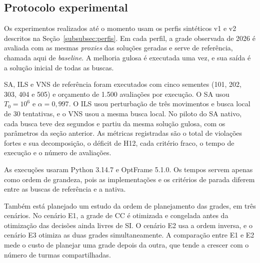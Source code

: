 \subsection{Protocolo experimental}
\label{subsec:protocolo}

Os experimentos realizados até o momento usam os perfis sintéticos v1 e v2 descritos na Seção~\ref{subsubsec:perfis}. Em cada perfil, a grade observada de 2026 é avaliada com as mesmas \textit{proxies} das soluções geradas e serve de referência, chamada aqui de \textit{baseline}. A melhoria gulosa é executada uma vez, e sua saída é a solução inicial de todas as buscas.

SA, ILS e VNS de referência foram executados com cinco sementes (101, 202, 303, 404 e 505) e orçamento de 1.500 avaliações por execução. O SA usou $T_0=10^6$ e $\alpha=0{,}997$. O ILS usou perturbação de três movimentos e busca local de 30 tentativas, e o VNS usou a mesma busca local. No piloto do SA nativo, cada busca teve dez segundos e partiu da mesma solução gulosa, com os parâmetros da seção anterior. As métricas registradas são o total de violações fortes e sua decomposição, o déficit de H12, cada critério fraco, o tempo de execução e o número de avaliações.

As execuções usaram Python 3.14.7 e OptFrame 5.1.0.  Os tempos servem apenas como ordem de grandeza, pois as implementações e os critérios de parada diferem entre as buscas de referência e a nativa.


Também está planejado um estudo da ordem de planejamento das grades, em três cenários. No cenário E1, a grade de CC é otimizada e congelada antes da otimização das decisões ainda livres de SI. O cenário E2 usa a ordem inversa, e o cenário E3 otimiza as duas grades simultaneamente. A comparação entre E1 e E2 mede o custo de planejar uma grade depois da outra, que tende a crescer com o número de turmas compartilhadas. 

